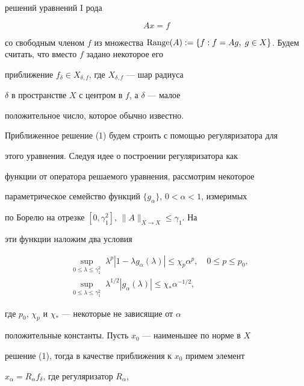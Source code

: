 решений уравнений I рода


\begin{equation}


Ax = f


\end{equation}


со свободным членом $f$ из  множества $\Range(A):=\{f: f=Ag,\;


g\in X\}$.  Будем считать, что вместо $f$ задано некоторое его


приближение  $f_\delta\in X_{\delta,f}$, где $X_{\delta,f}$ --- шар радиуса


$\delta$ в пространстве $X$ с центром в $f$, а $\delta$ --- малое


положительное число, которое обычно известно.





Приближенное решение (1) будем строить с помощью регуляризатора для


этого уравнения. Следуя идее \cite{B} о построении регуляризатора как


функции от оператора решаемого уравнения, рассмотрим некоторое


параметрическое семейство функций $\{g_\alpha\}$, $0<\alpha<1$, измеримых


по Борелю на отрезке $[0,\gamma_1^2]$, $\|A\|_{X\to X}\le\gamma_1$. На


эти функции наложим два условия


\begin{align}


&\sup_{0\le\lambda\le\gamma_1^2}\;


\lambda^p|1-\lambda g_\alpha(\lambda)| \le \chi_p \alpha^p,\quad


0\le p\le p_0, \\


%


&\sup_{0\le\lambda\le\gamma_1^2}\;


\lambda^{1/2}|g_\alpha(\lambda)| \le \chi_* \alpha^{-1/2},


\end{align}


где $p_0$, $\chi_p$ и $\chi_*$ --- некоторые не зависящие от $\alpha$


положительные  константы. Пусть $x_0$ --- наименьшее по норме в $X$


решение (1), тогда в качестве приближения к $x_0$  примем элемент


$x_\alpha=R_\alpha f_\delta$, где регуляризатор $R_\alpha$,



